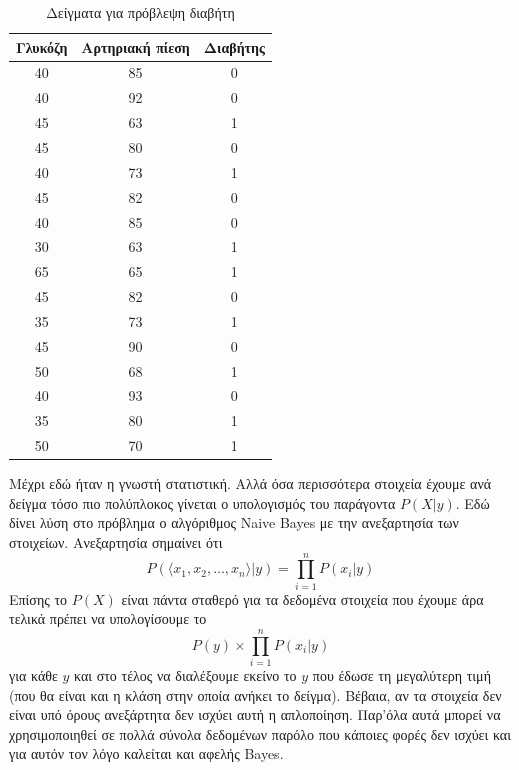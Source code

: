\begin{table}[H]
    \centering
    \begin{tabular}{|c|c|c|} \hline
        Γλυκόζη & Αρτηριακή πίεση & Διαβήτης \\ \hline
        40 & 85 & 0 \\ \hline
        40 & 92 & 0 \\ \hline
        45 & 63 & 1 \\ \hline
        45 & 80 & 0 \\ \hline
        40 & 73 & 1 \\ \hline
        45 & 82 & 0 \\ \hline
        40 & 85 & 0 \\ \hline
        30 & 63 & 1 \\ \hline
        65 & 65 & 1 \\ \hline
        45 & 82 & 0 \\ \hline
        35 & 73 & 1 \\ \hline
        45 & 90 & 0 \\ \hline
        50 & 68 & 1 \\ \hline
        40 & 93 & 0 \\ \hline
        35 & 80 & 1 \\ \hline
        50 & 70 & 1 \\ \hline
    \end{tabular}
    \caption{Δείγματα για πρόβλεψη διαβήτη}
\end{table}

Μέχρι εδώ ήταν η γνωστή στατιστική. Αλλά όσα περισσότερα στοιχεία έχουμε ανά δείγμα τόσο πιο
πολύπλοκος γίνεται ο υπολογισμός του παράγοντα $P(X|y)$. Εδώ δίνει λύση στο πρόβλημα ο
αλγόριθμος \textlatin{Naive Bayes} με την ανεξαρτησία των στοιχείων. Ανεξαρτησία σημαίνει
ότι
$$P(\langle x_1,x_2,\dots,x_n\rangle|y)=\prod\limits_{i=1}^nP(x_i|y)$$
Επίσης το $P(X)$ είναι πάντα σταθερό για τα δεδομένα στοιχεία που έχουμε άρα τελικά πρέπει
να υπολογίσουμε το
$$P(y)\times\prod\limits_{i=1}^nP(x_i|y)$$
για κάθε $y$ και στο τέλος να διαλέξουμε εκείνο το $y$ που έδωσε τη μεγαλύτερη τιμή
(που θα είναι και η κλάση στην οποία ανήκει το δείγμα). Βέβαια, αν τα στοιχεία δεν είναι
υπό όρους ανεξάρτητα δεν ισχύει αυτή η απλοποίηση. Παρ'όλα αυτά μπορεί να χρησιμοποιηθεί
σε πολλά σύνολα δεδομένων παρόλο που κάποιες φορές δεν ισχύει και για αυτόν τον λόγο
καλείται και αφελής \textlatin{Bayes}.

